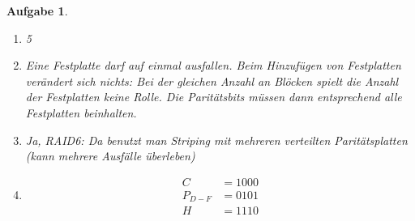 \documentclass[11pt]{article}
\theoremstyle{break}
\newtheorem{task}{Aufgabe}
\begin{document}
\begin{task}
	\hfill\vspace{-5mm}
	\begin{enumerate}[label={(\alph*)}]
		\item 5
		\item Eine Festplatte darf auf einmal ausfallen. Beim Hinzufügen von Festplatten verändert sich nichts: Bei der gleichen Anzahl an Blöcken spielt die Anzahl der Festplatten keine Rolle. Die Paritätsbits müssen dann entsprechend alle Festplatten beinhalten.
		\item Ja, RAID6: Da benutzt man Striping mit mehreren verteilten Paritätsplatten
(kann mehrere Ausfälle überleben)
		\item \begin{align*}
		C &= 1000\\
		P_{D-F} &= 0101\\
		H &= 1110
		\end{align*}
	\end{enumerate}
\end{task}
\end{document}
